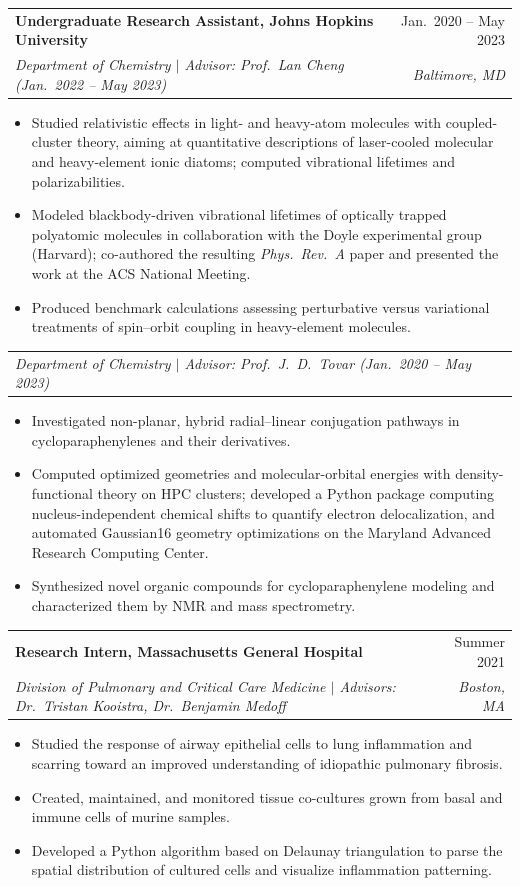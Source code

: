 \documentclass[letterpaper,10pt]{article}
\makeatletter
\newcommand{\resumeItem}[1]{\item\small{{#1 \vspace{-1pt}}}}
\newcommand{\resumeSubheading}[4]{
  \vspace{-1pt}\item
    \begin{tabular*}{0.97\textwidth}[t]{l@{\extracolsep{\fill}}r}
      \textbf{#1} & #2 \\
      \textit{\small#3} & \textit{\small #4} \\
    \end{tabular*}\vspace{-6pt}
}
\newcommand{\resumeSubSubheading}[2]{
    \item
    \begin{tabular*}{0.97\textwidth}{l@{\extracolsep{\fill}}r}
      \textit{\small#1} & \textit{\small #2} \\
    \end{tabular*}\vspace{-6pt}
}
\newcommand{\resumeItemListStart}{\begin{itemize}[itemsep=0pt, topsep=2pt]}
\newcommand{\resumeItemListEnd}{\end{itemize}\vspace{-4pt}}
\makeatother
\begin{document}
    \resumeSubheading
      {Undergraduate Research Assistant, Johns Hopkins University}{Jan.\ 2020 -- May 2023}
      {\textnormal{Department of Chemistry $\mid$ Advisor: Prof.\ Lan Cheng (Jan.\ 2022 -- May 2023)}}{Baltimore, MD}
      \resumeItemListStart
        \resumeItem{Studied relativistic effects in light- and heavy-atom molecules with coupled-cluster theory, aiming at quantitative descriptions of laser-cooled molecular and heavy-element ionic diatoms; computed vibrational lifetimes and polarizabilities.}
        \resumeItem{Modeled blackbody-driven vibrational lifetimes of optically trapped polyatomic molecules in collaboration with the Doyle experimental group (Harvard); co-authored the resulting \emph{Phys.\ Rev.\ A} paper and presented the work at the ACS National Meeting.}
        \resumeItem{Produced benchmark calculations assessing perturbative versus variational treatments of spin--orbit coupling in heavy-element molecules.}
      \resumeItemListEnd
    \resumeSubSubheading
      {Department of Chemistry $\mid$ Advisor: Prof.\ J.\ D.\ Tovar (Jan.\ 2020 -- May 2023)}{}
      \resumeItemListStart
        \resumeItem{Investigated non-planar, hybrid radial--linear conjugation pathways in cycloparaphenylenes and their derivatives.}
        \resumeItem{Computed optimized geometries and molecular-orbital energies with density-functional theory on HPC clusters; developed a Python package computing nucleus-independent chemical shifts to quantify electron delocalization, and automated Gaussian16 geometry optimizations on the Maryland Advanced Research Computing Center.}
        \resumeItem{Synthesized novel organic compounds for cycloparaphenylene modeling and characterized them by NMR and mass spectrometry.}
      \resumeItemListEnd

    \resumeSubheading
      {Research Intern, Massachusetts General Hospital}{Summer 2021}
      {\textnormal{Division of Pulmonary and Critical Care Medicine $\mid$ Advisors: Dr.\ Tristan Kooistra, Dr.\ Benjamin Medoff}}{Boston, MA}
      \resumeItemListStart
        \resumeItem{Studied the response of airway epithelial cells to lung inflammation and scarring toward an improved understanding of idiopathic pulmonary fibrosis.}
        \resumeItem{Created, maintained, and monitored tissue co-cultures grown from basal and immune cells of murine samples.}
        \resumeItem{Developed a Python algorithm based on Delaunay triangulation to parse the spatial distribution of cultured cells and visualize inflammation patterning.}
      \resumeItemListEnd
\end{document}
